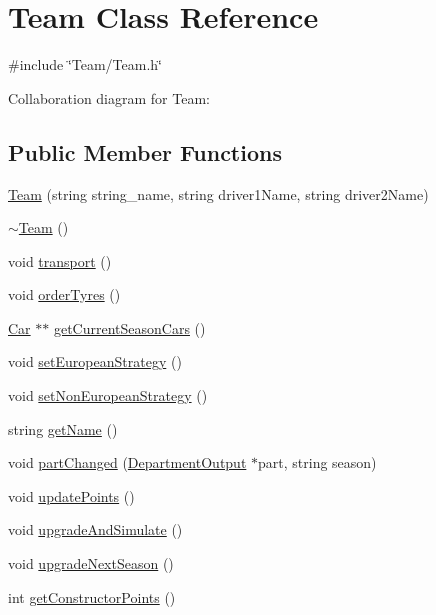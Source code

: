 \hypertarget{classTeam}{}\section{Team Class Reference}
\label{classTeam}


{\ttfamily \#include \char`\"{}Team/\+Team.\+h\char`\"{}}



Collaboration diagram for Team\+:
\subsection*{Public Member Functions}
\begin{DoxyCompactItemize}
\item 
\hyperlink{classTeam_acb3e8e4707763829d17d70b26deaee34}{Team} (string string\+\_\+name, string driver1\+Name, string driver2\+Name)
\item 
\hyperlink{classTeam_ab4218fddd612d52bab47bec4feeb49de}{$\sim$\+Team} ()
\item 
void \hyperlink{classTeam_a21681f514dea00fe6bca432ef64eab1e}{transport} ()
\item 
void \hyperlink{classTeam_a6bf3c6839b7d2e4b38fbb160c41a40ab}{order\+Tyres} ()
\item 
\hyperlink{classCar}{Car} $\ast$$\ast$ \hyperlink{classTeam_a8e71e64acc74a3346e373dde33f08233}{get\+Current\+Season\+Cars} ()
\item 
void \hyperlink{classTeam_a1fad6776814f2caf74088ee644435ae1}{set\+European\+Strategy} ()
\item 
void \hyperlink{classTeam_a0eb5e6b897c90aa5026be4a0822c9fa5}{set\+Non\+European\+Strategy} ()
\item 
string \hyperlink{classTeam_ab21736a411213da36d08210e570ecbeb}{get\+Name} ()
\item 
void \hyperlink{classTeam_add32843daa734d808b93e5a9793b158a}{part\+Changed} (\hyperlink{classDepartmentOutput}{Department\+Output} $\ast$part, string season)
\item 
void \hyperlink{classTeam_a013d81d7848893aef82a0e701b26777c}{update\+Points} ()
\item 
void \hyperlink{classTeam_adc73729b63d1a52595c60f9e29d6e429}{upgrade\+And\+Simulate} ()
\item 
void \hyperlink{classTeam_aedf4b8a3cd9edb5349b2b1d7dd965a2f}{upgrade\+Next\+Season} ()
\item 
int \hyperlink{classTeam_ab34663d641e1fee1e3d924b8e0f17eb9}{get\+Constructor\+Points} ()
\end{DoxyCompactItemize}
